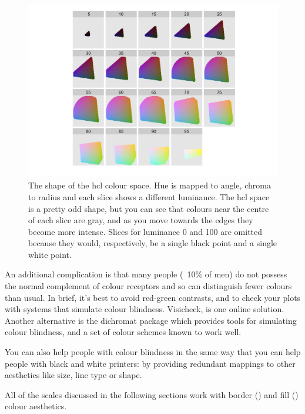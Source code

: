 \begin{figure}[htbp]
  \centering
    \includegraphics[width=\linewidth]{hcl-space}
  \caption{The shape of the hcl colour space.  Hue is mapped to angle, chroma to radius and each slice shows a different luminance.  The hcl space is a pretty odd shape, but you can see that colours near the centre of each slice are gray, and as you move towards the edges they become more intense.  Slices for luminance 0 and 100 are omitted because they would, respectively, be a single black point and a single white point.}
  \label{fig:label}
\end{figure}

An additional complication is that many people (~10\% of men) do not possess the normal complement of colour receptors and so can distinguish fewer colours than usual.  In brief, it's best to avoid red-green contrasts, and to check your plots with systems that simulate colour blindness.  Visicheck, is one online solution.  Another alternative is the dichromat package \citep{dichromat} which provides tools for simulating colour blindness, and a set of colour schemes known to work well.

You can also help people with colour blindness in the same way that you can help people with black and white printers: by providing redundant mappings to other aesthetics like size, line type or shape.

All of the scales discussed in the following sections work with border () and fill () colour aesthetics.


